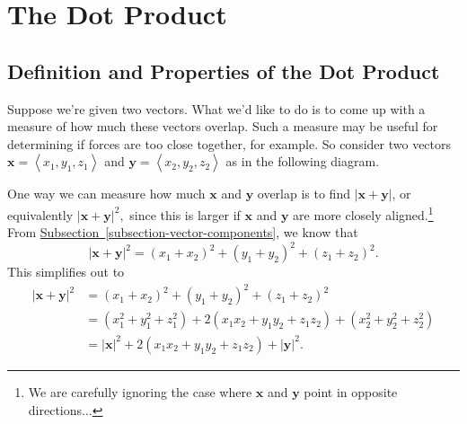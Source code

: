 \documentclass[10pt,]{book}
\numberwithin{equation}{section}
\newcommand{\vv}[1]{\mathbf{#1}}
\newcommand{\dotprod}[1]{\left\langle #1 \right\rangle}
\begin{document}
\section[{The Dot Product}]{The Dot Product}\label{section-the-dot-product}
%
%
\typeout{************************************************}
\typeout{************************************************}
%
\subsection[{Definition and Properties of the Dot Product}]{Definition and Properties of the Dot Product}\label{subsection-definition-and-properties-of-the-dot-product}
\hypertarget{p-1125}{}%
Suppose we're given two vectors. What we'd like to do is to come up with a measure of how much these vectors overlap. Such a measure may be useful for determining if forces are too close together, for example. So consider two vectors \(\vv{x} = \dotprod{x_{1},y_{1},z_{1}}\) and \(\vv{y} = \dotprod{x_{2},y_{2},z_{2}}\) as in the following diagram.%
\begin{figure}
\centering
{
}
\end{figure}
\hypertarget{p-1126}{}%
One way we can measure how much \(\vv{x}\) and \(\vv{y}\) overlap is to find \(|\vv{x}+\vv{y}|\), or equivalently \(|\vv{x}+\vv{y}|^{2},\) since this is larger if \(\vv{x}\) and \(\vv{y}\) are more closely aligned.\footnote{We are carefully ignoring the case where \(\vv{x}\) and \(\vv{y}\) point in opposite directions...\label{fn-5}} From \hyperref[subsection-vector-components]{Subsection~\ref{subsection-vector-components}}, we know that%
%
\begin{equation*}
|\vv{x}+\vv{y}|^{2} = (x_{1}+x_{2})^{2} + (y_{1}+y_{2})^{2} + (z_{1}+z_{2})^{2}.
\end{equation*}
\hypertarget{p-1127}{}%
This simplifies out to%
%
\begin{align*}
|\vv{x}+\vv{y}|^{2} & = (x_{1}+x_{2})^{2} + (y_{1}+y_{2})^{2} + (z_{1}+z_{2})^{2} \\
& = (x_{1}^{2}+y_{1}^{2}+z_{1}^{2}) + 2(x_{1}x_{2} + y_{1}y_{2} + z_{1}z_{2}) + (x_{2}^{2} + y_{2}^{2} + z_{2}^{2}) \\
& = |\vv{x}|^{2} + 2(x_{1}x_{2} + y_{1}y_{2} + z_{1}z_{2}) + |\vv{y}|^{2}. 
\end{align*}
\end{document}
